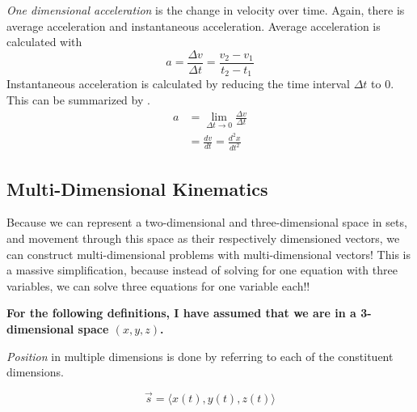 \begin{definition}[Acceleration]\label{def:1-D Acceleration}
  \emph{One dimensional acceleration} is the change in velocity over time.
  Again, there is average acceleration and instantaneous acceleration.
  Average acceleration is calculated with 
  \begin{equation}\label{eq:1-D Average Acceleration}
    a = \frac{\Delta v}{\Delta t} = \frac{v_{2} - v_{1}}{t_{2} - t_{1}}
  \end{equation}
  Instantaneous acceleration is calculated by reducing the time interval $\Delta t$ to 0.
  This can be summarized by .
  \begin{equation}\label{eq:1-D Instantaneous Acceleration}
    \begin{aligned}
      a &= \lim\limits_{\Delta t \to 0} \frac{\Delta v}{\Delta t} \\
      &= \frac{dv}{dt} = \frac{d^{2}x}{dt^{2}}
    \end{aligned}
  \end{equation}
\end{definition}

\subsection{Multi-Dimensional Kinematics}\label{Multi-D Kinematics}
Because we can represent a two-dimensional and three-dimensional space in sets, and movement through this space as their respectively dimensioned vectors, we can construct multi-dimensional problems with multi-dimensional vectors!
This is a massive simplification, because instead of solving for one equation with three variables, we can solve three equations for one variable each!!

\textbf{For the following definitions, I have assumed that we are in a 3-dimensional space $(x, y, z)$.}

\begin{definition}\label{Multi-D Position}
  \emph{Position} in multiple dimensions is done by referring to each of the constituent dimensions.

  \begin{equation}\label{eq:Multi-D Position}
    \vec{s} = \bigl\langle x(t), y(t), z(t) \bigr\rangle
  \end{equation}
\end{definition}

